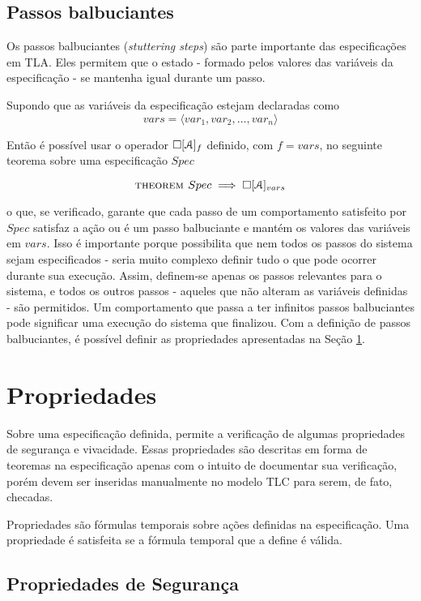 \subsection{Passos balbuciantes}

Os passos balbuciantes (\textit{stuttering steps}) são parte importante das especificações em TLA. Eles permitem que o estado - formado pelos valores das variáveis da especificação - se mantenha igual durante um passo.

Supondo que as variáveis da especificação estejam declaradas como
\[vars = \langle var_1, var_2, \dots, var_n\rangle\]

Então é possível usar o operador $\square [\textbf{$\mathcal{A}$}]_f$ definido, com $f = vars$, no seguinte teorema sobre uma especificação $Spec$

\[\textsc{theorem } Spec \implies \square [\textbf{$\mathcal{A}$}]_{vars}\]

o que, se verificado, garante que cada passo de um comportamento satisfeito por $Spec$ satisfaz a ação \FANCYA ou é um passo balbuciante e mantém os valores das variáveis em $vars$. Isso é importante porque possibilita que nem todos os passos do sistema sejam especificados - seria muito complexo definir tudo o que pode ocorrer durante sua execução. Assim, definem-se apenas os passos relevantes para o sistema, e todos os outros passos - aqueles que não alteram as variáveis definidas - são permitidos. Um comportamento que passa a ter infinitos passos balbuciantes pode significar uma execução do sistema que finalizou. Com a definição de passos balbuciantes, é possível definir as propriedades apresentadas na Seção \ref{propriedades}.

\section{Propriedades}
\label{propriedades}

Sobre uma especificação definida, \TLA permite a verificação de algumas propriedades de segurança e vivacidade. Essas propriedades são descritas em forma de teoremas na especificação apenas com o intuito de documentar sua verificação, porém devem ser inseridas manualmente no modelo TLC para serem, de fato, checadas.

Propriedades são fórmulas temporais sobre ações definidas na especificação. Uma propriedade é satisfeita se a fórmula temporal que a define é válida.

\subsection{Propriedades de Segurança}

